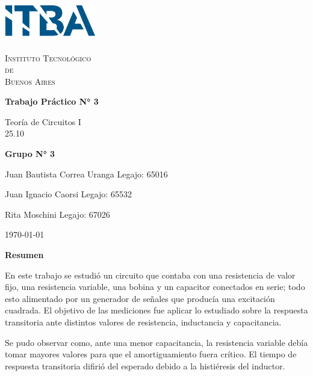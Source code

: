 \documentclass{article}
\newcommand{\Facultad}{Instituto Tecnológico \\de\\ Buenos Aires} %
\newcommand{\TPn}{Trabajo Práctico N° 3}
\begin{document}
\begin{titlepage} %

        \begin{flushleft}
            \centering
            \includegraphics[width=0.3\textwidth]{Logo_ITBA.png}
        \end{flushleft}

        \centering
            
        {\scshape\LARGE \Facultad \par} %
        \vspace{1cm}                    %


        {\huge\bfseries \TPn \par}
        \vspace{1.5cm}
        {\Large Teoría de Circuitos I\\ 25.10 \par}
        \vfill                      %
        {\Large \bfseries Grupo N° 3 \par}
        \vspace{1cm}
        {\large Juan Bautista Correa Uranga \hfill Legajo: 65016 \par} %
        {\large Juan Ignacio Caorsi \hfill Legajo: 65532  \par}
        {\large Rita Moschini \hfill Legajo: 67026 \par} 
        \vfill
        {\large \today\par}
        \vfil

    \end{titlepage}

{\centering \LARGE \bfseries Resumen \par}

En este trabajo se estudió un circuito que contaba con una resistencia de valor fijo, una resistencia variable, una bobina y un 
capacitor conectados en serie; todo esto alimentado por un generador de señales que producía una excitación cuadrada. El objetivo 
de las mediciones fue aplicar lo estudiado sobre la respuesta transitoria ante distintos valores de resistencia, inductancia y
 capacitancia. \par
Se pudo observar como, ante una menor capacitancia, la resistencia variable debía tomar mayores valores para que el amortiguamiento 
fuera crítico. El tiempo de respuesta transitoria difirió del esperado debido a la histiéresis del inductor.
\end{document}
